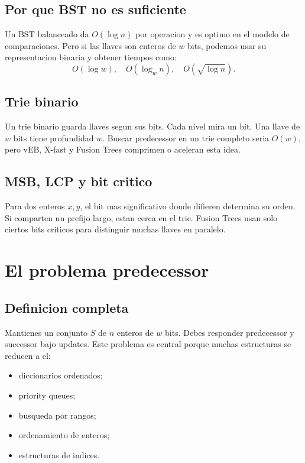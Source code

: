 \documentclass[10pt]{article}
\newcommand{\bigO}{O}
\begin{document}
\subsection{Por que BST no es suficiente}
Un BST balanceado da $\bigO(\log n)$ por operacion y es optimo en el modelo de
comparaciones. Pero si las llaves son enteros de $w$ bits, podemos usar su
representacion binaria y obtener tiempos como:
\[
\bigO(\log w),\quad \bigO(\log_w n),\quad \bigO(\sqrt{\log n}).
\]

\subsection{Trie binario}
Un trie binario guarda llaves segun sus bits. Cada nivel mira un bit. Una llave
de $w$ bits tiene profundidad $w$. Buscar predecessor en un trie completo seria
$\bigO(w)$, pero vEB, X-fast y Fusion Trees comprimen o aceleran esta idea.

\subsection{MSB, LCP y bit critico}
Para dos enteros $x,y$, el bit mas significativo donde difieren determina su
orden. Si comparten un prefijo largo, estan cerca en el trie. Fusion Trees usan
solo ciertos bits criticos para distinguir muchas llaves en paralelo.

\newpage
\section{El problema predecessor}

\subsection{Definicion completa}
Mantienes un conjunto $S$ de $n$ enteros de $w$ bits. Debes responder predecessor
y successor bajo updates. Este problema es central porque muchas estructuras se
reducen a el:
\begin{itemize}[leftmargin=*]
\item diccionarios ordenados;
\item priority queues;
\item busqueda por rangos;
\item ordenamiento de enteros;
\item estructuras de indices.
\end{itemize}
\end{document}
